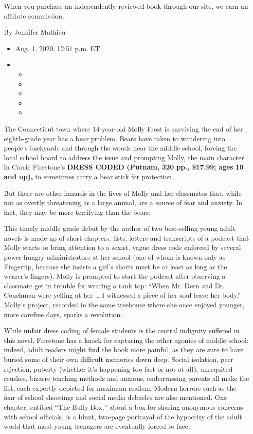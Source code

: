 When you purchase an independently reviewed book through our site, we
earn an affiliate commission.

By Jennifer Mathieu

\begin{itemize}
\item
  Aug. 1, 2020, 12:51 p.m. ET
\item
  \begin{itemize}
  \item
  \item
  \item
  \item
  \item
  \end{itemize}
\end{itemize}

The Connecticut town where 14-year-old Molly Frost is surviving the end
of her eighth-grade year has a bear problem. Bears have taken to
wandering into people's backyards and through the woods near the middle
school, forcing the local school board to address the issue and
prompting Molly, the main character in Carrie Firestone's \textbf{DRESS
CODED (Putnam, 320 pp., \$17.99; ages 10 and up),} to sometimes carry a
bear stick for protection.

But there are other hazards in the lives of Molly and her classmates
that, while not as overtly threatening as a large animal, are a source
of fear and anxiety. In fact, they may be more terrifying than the
bears.

This timely middle grade debut by the author of two best-selling young
adult novels is made up of short chapters, lists, letters and
transcripts of a podcast that Molly starts to bring attention to a
sexist, vague dress code enforced by several power-hungry administrators
at her school (one of whom is known only as Fingertip, because she
insists a girl's shorts must be at least as long as the wearer's
fingers). Molly is prompted to start the podcast after observing a
classmate get in trouble for wearing a tank top: ``When Mr. Dern and Dr.
Couchman were yelling at her \ldots{} I witnessed a piece of her soul
leave her body.'' Molly's project, recorded in the same treehouse where
she once enjoyed younger, more carefree days, sparks a revolution.

While unfair dress coding of female students is the central indignity
suffered in this novel, Firestone has a knack for capturing the other
agonies of middle school; indeed, adult readers might find the book more
painful, as they are sure to have buried some of their own difficult
memories down deep. Social isolation, peer rejection, puberty (whether
it's happening too fast or not at all), unrequited crushes, bizarre
teaching methods and anxious, embarrassing parents all make the list,
each expertly depicted for maximum realism. Modern horrors such as the
fear of school shootings and social media debacles are also mentioned.
One chapter, entitled ``The Bully Box,'' about a box for sharing
anonymous concerns with school officials, is a blunt, two-page portrayal
of the hypocrisy of the adult world that most young teenagers are
eventually forced to face.

